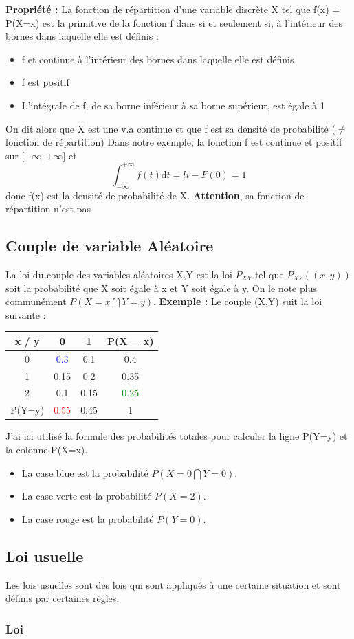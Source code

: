 \documentclass[a4paper]{article}
\begin{document}
\textbf{Propriété :} La fonction de répartition d'une variable discrète X tel que f(x) = P(X=x) est la primitive de la fonction f dans si et seulement si, à l'intérieur des bornes dans laquelle elle est définis :
\begin{itemize}
\item f et continue à l'intérieur des bornes dans laquelle elle est définis
\item f est positif 
\item L'intégrale de f, de sa borne inférieur à sa borne supérieur, est égale à 1
\end{itemize} 
On dit alors que X est une v.a continue et que f est sa densité de probabilité ($\neq$ fonction de répartition)
Dans notre exemple, la fonction f est continue et positif sur [$-\infty , +\infty$] et 
$$ \int_{-\infty}^{+\infty} f(t)\text{d}t = li - F(0) = 1 $$
donc f(x) est la densité de probabilité de X. \textbf{Attention}, sa fonction de répartition n'est pas 

\subsection{Couple de variable Aléatoire}

La loi du couple des variables aléatoires X,Y est la loi $P_{XY}$ tel que $P_{XY}({(x,y)})$ soit la probabilité que X soit égale à x et Y soit égale à y. On le note plus communément $P(X=x \bigcap Y=y)$. \newline
\textbf{Exemple :} Le couple (X,Y) suit la loi suivante : \newline
\begin{tabular}{|c|c|c|c|}
\hline
x / y & 0 & 1 & P(X = x)\\
\hline
0 & \textcolor{Blue}{0.3} & 0.1 & 0.4\\
\hline
1 & 0.15 & 0.2 & 0.35 \\
\hline
2 & 0.1 & 0.15 & \textcolor{Green}{0.25}\\
\hline
P(Y=y) & \textcolor{Red}{0.55} & 0.45 & 1\\
\hline
\end{tabular}
\newline
J'ai ici utilisé la formule des probabilités totales pour calculer la ligne P(Y=y) et la colonne P(X=x).
\begin{itemize}
\item La case blue est la probabilité $P(X=0 \bigcap Y=0)$. 
\item La case verte est la probabilité $P(X=2)$. 
\item La case rouge est la probabilité $P(Y=0)$. 
\end{itemize}
\subsection{Loi usuelle}
Les lois usuelles sont des lois qui sont appliqués à une certaine situation et sont définis par certaines règles.
\subsubsection{Loi}
\end{document}
